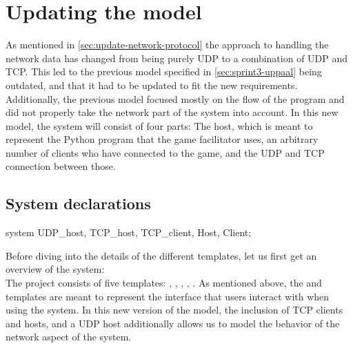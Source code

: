 \section{Updating the \uppaal model}
As mentioned in \autoref{sec:update-network-protocol} the approach to handling the network data has changed from being purely UDP to a combination of UDP and TCP.
This led to the previous \uppaal model specified in \autoref{sec:sprint3-uppaal} being outdated, and that it had to be updated to fit the new requirements.
\\
Additionally, the previous model focused mostly on the flow of the program and did not properly take the network part of the system into account.
In this new model, the system will consist of four parts: The host, which is meant to represent the Python program that the game facilitator uses, an arbitrary number of clients who have connected to the game, and the UDP and TCP connection between those.

\subsection{System declarations}
\begin{uppaalcode}[caption={System declarations}, label={lst:uppaal4:systemdecl},captionpos=b]
    system UDP_host, TCP_host, TCP_client, Host, Client;
\end{uppaalcode}
Before diving into the details of the different templates, let us first get an overview of the system:\\
The project consists of five templates: , , , , .
As mentioned above, the  and  templates are meant to represent the interface that users interact with when using the system.
In this new version of the model, the inclusion of TCP clients and hosts, and a UDP host additionally allows us to model the behavior of the network aspect of the system.

